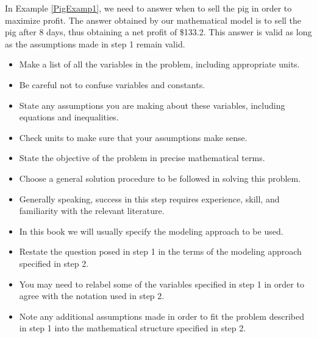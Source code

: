 \vspace{1em}
\hspace{-1.5em}{\bf Step 5. Answer the question}

In Example \ref{PigExamp1}, we need to answer when to sell the pig in order to maximize profit. The answer obtained by our mathematical
model is to sell the pig after 8 days, thus obtaining a net profit of \$133.2. This answer is valid as long as the assumptions made in step 1 remain valid.

\vspace{1em}
\hspace{-1.5em}{\bf\large Conclusion:}

\vspace{1em}
\hspace{-1.5em}{\bf Step 1. Ask the question.}
\begin{itemize}
\item Make a list of all the variables in the problem, including appropriate units.
\item Be careful not to confuse variables and constants.
\item State any assumptions you are making about these variables, including equations and inequalities.
\item Check units to make sure that your assumptions make sense.
\item State the objective of the problem in precise mathematical terms.
\end{itemize}

\vspace{1em}
\hspace{-1.5em}{\bf Step 2. Select the modeling approach.}
\begin{itemize}
\item Choose a general solution procedure to be followed in solving this problem.
\item Generally speaking, success in this step requires experience, skill, and familiarity with the relevant literature.
\item In this book we will usually specify the modeling approach to be used.
\end{itemize}

\vspace{1em}
\hspace{-1.5em}{\bf Step 3. Formulate the model.}
\begin{itemize}
\item Restate the question posed in step 1 in the terms of the modeling approach
specified in step 2.
\item You may need to relabel some of the variables specified in step 1 in order to agree with the notation used in step 2.
\item Note any additional assumptions made in order to fit the problem described in step 1 into the mathematical structure specified in step 2.
\end{itemize}

